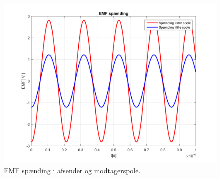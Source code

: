 \begin{figure}[h!]
	\centering
	\includegraphics[width=1\textwidth]{billeder/EMF_spanding.png}
	\caption{EMF spænding i afsender og modtagerspole.}
	\label{fig:EMF_spole}
\end{figure}

